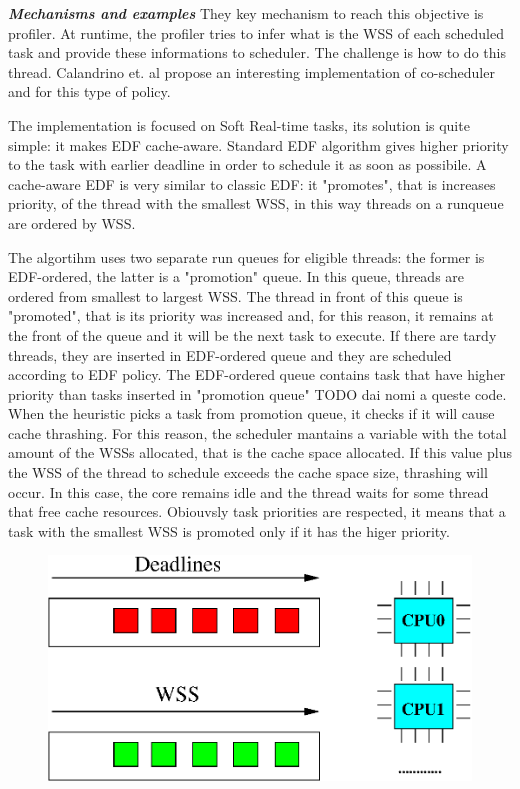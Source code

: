\begin{description}
\textit{\textbf{Mechanisms and examples}} They key mechanism to reach this objective is profiler. At runtime, the profiler tries to infer what is the WSS 
of each scheduled task and provide these informations to scheduler. The challenge is how to do this thread. 
Calandrino et. al \cite{calandro} propose an interesting implementation of co-scheduler and for this type of policy.

The implementation is focused on Soft Real-time tasks, its solution is quite simple: it makes EDF cache-aware. Standard EDF algorithm gives higher priority 
to the task with earlier deadline in order to schedule it as soon as possibile. A cache-aware EDF is very similar to classic EDF: it "promotes", that is 
increases priority, of the thread with the smallest WSS, in this way threads on a runqueue are ordered by WSS.

The algortihm uses two separate run queues for eligible threads: the former is EDF-ordered, the latter is a "promotion" queue. In this queue, threads are ordered
from smallest to largest WSS. The thread in front of this queue is "promoted", that is its priority was increased and, for this reason, it remains at the front
of the queue and it will be the next task to execute. If there are tardy threads, they are inserted in EDF-ordered queue and they are scheduled according to 
EDF policy. The EDF-ordered queue contains task that have higher priority than tasks inserted in "promotion queue" TODO dai nomi a queste code.
When the heuristic picks a task from promotion queue, it checks if it will cause cache thrashing. For this reason, the scheduler mantains a variable with 
the total amount of the WSSs allocated, that is the cache space allocated. If this value plus the WSS of the thread to schedule exceeds the cache space size, 
thrashing will occur. In this case, the core remains idle and the thread waits for some thread that free cache resources.
Obiouvsly task priorities are respected, it means that a task with the smallest WSS is promoted only if it has the higer priority.

\begin{figure}[htbp]
\centering
\includegraphics[width=\widefigure]{images/edf_wss.eps}
\caption{}
\label{fig:edf_wss}
\end{figure}


\end{description}
